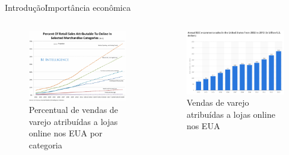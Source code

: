 \begin{frame}{Introdução}{Importância econômica}
\begin{columns}[c] %


\begin{figure}[ht]
    \begin{center}
    \includegraphics[width=1\textwidth]{img/crescimento-ecommerce}\caption{Percentual de vendas de varejo atribuídas a lojas online nos EUA por categoria \cite{crescimento-ecommerce}}
    \end{center}
\end{figure}

\begin{figure}[ht]
    \begin{center}
    \includegraphics[width=1\textwidth]{img/sales-ecommerce}\caption{Vendas de varejo atribuídas a lojas online nos EUA \cite{sales-ecommerce}}
    \end{center}
\end{figure}

\end{columns}

\end{frame}
